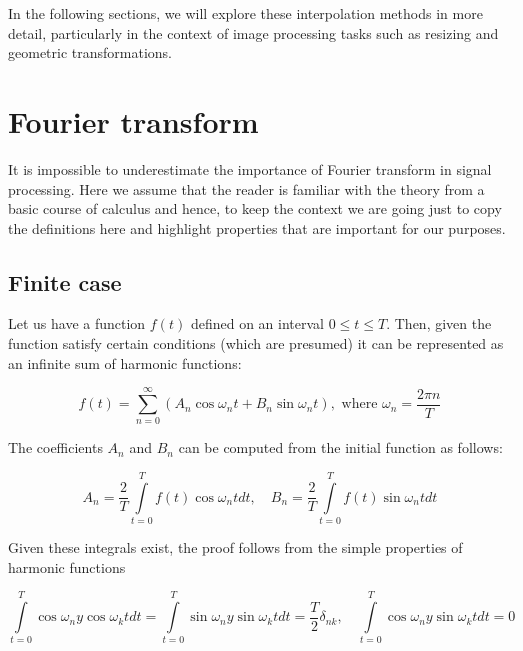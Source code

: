 \documentclass[11pt]{book}
\begin{document}
In the following sections, we will explore these interpolation methods in more detail, particularly in the context of image processing tasks such as resizing and geometric transformations.


\section{Fourier transform}

It is impossible to underestimate the importance of Fourier transform in signal processing. Here we assume that the reader is familiar with the theory from a basic course of calculus and hence, to keep the context we are going just to copy the definitions here and highlight properties that are important for our purposes.

\subsection{Finite case}

Let us have a function $f(t)$ defined on an interval $ 0 \leq t \leq T$. Then, given the function satisfy certain conditions (which are presumed) it can be represented as an infinite sum of harmonic functions:

\begin{equation}
f(t) = \sum\limits_{n=0}^\infty \left(A_n \cos{\omega_n t} + B_n \sin{\omega_n t}\right), \text{ where } \omega_n = \frac{2 \pi n}{T}\label{fourier_finite}
\end{equation}

The coefficients $A_n$ and $B_n$ can be computed from the initial function as follows:

\begin{equation}
A_n = \frac{2}{T}\int\limits_{t=0}^T f(t) \cos{\omega_n t} dt,\quad B_n = \frac{2}{T}\int\limits_{t=0}^T f(t) \sin{\omega_n t} dt\label{fourier_finite_coefficients}
\end{equation}

Given these integrals exist, the proof follows from the simple properties of harmonic functions

\begin{equation}
\int\limits_{t=0}^T \cos{\omega_n}y \cos{\omega_kt} dt = \int\limits_{t=0}^T \sin{\omega_n}y \sin{\omega_kt} dt = \frac{T}{2}\delta_{nk},\quad \int\limits_{t=0}^T \cos{\omega_n}y \sin{\omega_kt} dt = 0
\end{equation}
\end{document}
